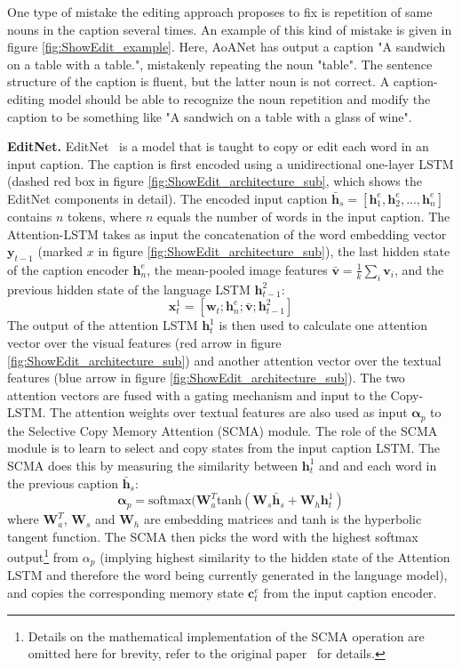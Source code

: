 \documentclass[english,twoside,openright]{HYgraduMLDS}
\newcommand{\matr}[1]{\bm{#1}}
\newcommand{\vect}[1]{\bm{#1}}
\begin{document}
One type of mistake the editing approach proposes to fix is repetition of same nouns in the caption several times. An example of this kind of mistake is given in figure \ref{fig:ShowEdit_example}. Here, AoANet has output a caption "A sandwich on a table with a table.", mistakenly repeating the noun "table". The sentence structure of the caption is fluent, but the latter noun is not correct. A caption-editing model should be able to recognize the noun repetition and modify the caption to be something like "A sandwich on a table with a glass of wine".

\textbf{EditNet.}
EditNet~\cite{ShowEdit} is a model that is taught to copy or edit each word in an input caption. The caption is first encoded using a unidirectional
one-layer LSTM (dashed red box in figure \ref{fig:ShowEdit_architecture_sub}, which shows the EditNet components in detail). The encoded input caption $\bar{\vect{h}}_s = \left[ \vect{h}^e_1,  \vect{h}^e_2, \text{...}, \vect{h}^e_n \right]$ contains $n$ tokens, where $n$ equals the number of words in the input caption. The Attention-LSTM takes as input the concatenation of the word embedding vector $\vect{y}_{t-1}$ (marked $x$ in figure \ref{fig:ShowEdit_architecture_sub}), the last hidden state of the caption encoder $\vect{h}^e_n$, the mean-pooled image features $\bar{\vect{v}} = \frac{1}{k} \sum_i \vect{v}_i$, and the previous hidden state of the language
LSTM $\vect{h}^2_{t-1}$:
\begin{equation}
\vect{x}^1_t = [\matr{w}_t; \vect{h}^e_n; \bar{\vect{v}}; \vect{h}^2_{t-1}]
\end{equation}
%
The output of the attention LSTM $\vect{h}^1_t$ is then used to calculate one attention vector over the visual features (red arrow in figure \ref{fig:ShowEdit_architecture_sub}) and another attention vector over the textual features (blue arrow in figure \ref{fig:ShowEdit_architecture_sub}). The two attention vectors are fused with a gating mechanism and input to the Copy-LSTM. The attention weights over textual features are also used as input $\vect{\alpha}_p$ to the Selective Copy Memory Attention (SCMA) module. The role of the SCMA module is to learn to select and copy states from the input caption LSTM. The SCMA does this by measuring the similarity between $\vect{h}^1_t$ and and each word in the previous caption $\bar{\vect{h}}_s$: 
\begin{equation}
\vect{\alpha}_p = \text{softmax} (\matr{W}^T_a \text{tanh} (\matr{W}_s \bar{\vect{h}}_s + \matr{W}_h \vect{h}^1_t)
\end{equation}
%
where $\matr{W}^T_a$, $\matr{W}_s$ and $\matr{W}_h$ are embedding matrices and tanh is the hyperbolic tangent function. The SCMA then picks the word with the highest softmax output\footnote{Details on the mathematical implementation of the SCMA operation are omitted here for brevity, refer to the original paper~\cite{ShowEdit} for details.} from $\alpha_p$ (implying highest similarity to the hidden state of the Attention LSTM and therefore the word being currently generated in the language model), and copies the corresponding memory state $\vect{c}^e_t$ from the input caption encoder.
\end{document}
